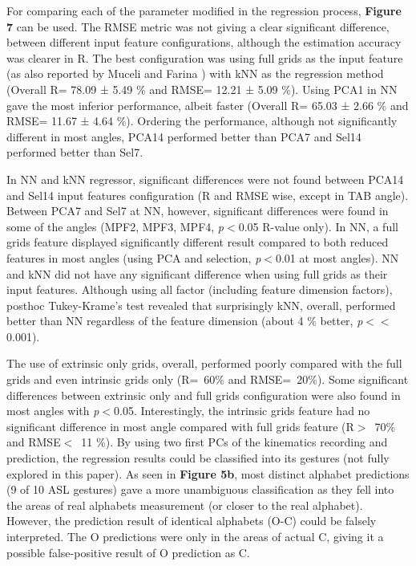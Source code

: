 \documentclass[conference]{IEEEtran}
\begin{document}
For comparing each of the parameter modified in the regression process, \textbf{Figure 7} can be used. The 
RMSE metric was not giving a clear significant difference, between different input feature configurations, 
although the estimation accuracy was clearer in R. The best configuration was using full grids as the input 
feature (as also reported by Muceli and Farina \cite{b9}) with kNN as the regression method (Overall R= 78.09 ± 
5.49 \% and RMSE= 12.21 ± 5.09 \%). Using PCA1 in NN gave the most inferior performance, albeit faster 
(Overall R= 65.03 ± 2.66 \% and RMSE= 11.67 ± 4.64 \%). Ordering the performance, although not 
significantly different in most angles, PCA14 performed better than PCA7 and Sel14 performed better than 
Sel7.

In NN and kNN regressor, significant differences were not found between PCA14 and Sel14 input 
features configuration (R and RMSE wise, except in TAB angle). Between PCA7 and Sel7 at NN, however, 
significant differences were found in some of the angles (MPF2, MPF3, MPF4, \textit{p}$<$0.05 R-value only). In 
NN, a full grids feature displayed significantly different result compared to both reduced features in most 
angles (using PCA and selection, \textit{p}$<$0.01 at most angles). NN and kNN did not have any significant 
difference when using full grids as their input features. Although using all factor (including feature 
dimension factors), posthoc Tukey-Krame’s test revealed that surprisingly kNN, overall, performed better 
than NN regardless of the feature dimension (about 4 \% better, \textit{p}$<$$<$0.001).

The use of extrinsic only grids, overall, performed poorly compared with the full grids and even 
intrinsic grids only (R=~60\% and RMSE=~20\%). Some significant differences between extrinsic only and 
full grids configuration were also found in most angles with \textit{p}$<$0.05. Interestingly, the intrinsic grids feature 
had no significant difference in most angle compared with full grids feature (R$>$~70\% and RMSE$<$~11 \%). 
By using two first PCs of the kinematics recording and prediction, the regression results could be 
classified into its gestures (not fully explored in this paper). As seen in \textbf{Figure 5b}, most distinct alphabet 
predictions (9 of 10 ASL gestures) gave a more unambiguous classification as they fell into the areas of real 
alphabets measurement (or closer to the real alphabet). However, the prediction result of identical alphabets 
(O-C) could be falsely interpreted. The O predictions were only in the areas of actual C, giving it a possible 
false-positive result of O prediction as C.
\end{document}
